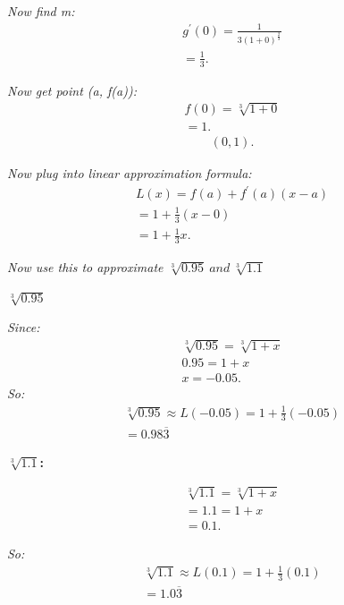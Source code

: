 \documentclass{report}
\begin{document}
    \bigbreak \noindent 
    \textit{Now find m:}
    \begin{align*}
      g^{\prime}(0) = \frac{1}{3(1+0)^{\frac{2}{3}}} \\ 
      = \frac{1}{3}
    .\end{align*}

    \bigbreak \noindent 
    \textit{Now get point (a, f(a)):}
    \begin{align*}
      f(0) = \sqrt[3]{1+0} \\ 
      = 1
    .\end{align*}
    \begin{align*}
      (0,1)
    .\end{align*}

    \bigbreak \noindent 
    \textit{Now plug into linear approximation formula:}
    \begin{align*}
      L(x) = f(a) + f^{\prime}(a)(x-a) \\ 
      = 1 + \frac{1}{3}(x-0) \\ 
      = 1+ \frac{1}{3}x
    .\end{align*}

    \bigbreak \noindent 
    \textit{Now use this to approximate $\sqrt[3]{0.95}\ and\ \sqrt[3]{1.1}$}

    \bigbreak \noindent 
    \textbf{\textit{\underline{$\sqrt[3]{0.95}$}}}

    \bigbreak \noindent 
    \textit{Since:}
    \begin{align*}
      \sqrt[3]{0.95} = \sqrt[3]{1+x} \\ 
      0.95 = 1 + x \\
      x = -0.05
    .\end{align*}
    \bigbreak \noindent
    \textit{So:}
    \begin{align*}
      \sqrt[3]{0.95} \approx L(-0.05) = 1+ \frac{1}{3}(-0.05) \\
      = 0.98\overline{3}
    \end{align*}

    \bigbreak \noindent 
    \textbf{\textit{\underline{$\sqrt[3]{1.1}$}}:}

    \bigbreak \noindent 
    \begin{align*}
      \sqrt[3]{1.1} = \sqrt[3]{1+x} \\ 
      = 1.1 = 1 + x \\ 
      = 0.1
    .\end{align*}

    \bigbreak \noindent
    \textit{So:}
    \begin{align*}
      \sqrt[3]{1.1} \approx L(0.1) = 1+ \frac{1}{3}(0.1) \\ 
      = 1.0\overline{3}
    \end{align*}
\end{document}
